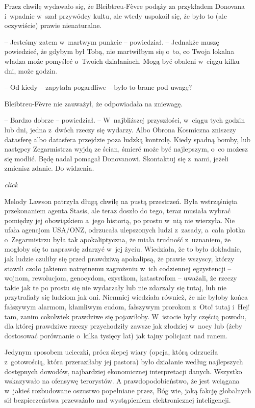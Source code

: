 \documentclass[oneside,polish,11pt,sfheadings]{mwbk}
\begin{document}
Przez chwilę wydawało się, że Bleibtreu-Fèvre podąży za przykładem
Donovana i~wpadnie w~szał przywódcy kultu, ale wtedy uspokoił się, że
było to (ale oczywiście) prawie nienaturalne.

-- Jesteśmy zatem w~martwym punkcie -- powiedział. -- Jednakże muszę
powiedzieć, że gdybym był Tobą, nie martwiłbym się o~to, co Twoja
lokalna władza może pomyśleć o~Twoich działaniach. Mogą być obaleni w~ciągu kilku dni, może godzin.

-- Od kiedy -- zapytała pogardliwe -- było to brane pod uwagę?

Bleibtreu-Fèvre nie zauważył, że odpowiadała na zniewagę. 

-- Bardzo
dobrze -- powiedział. -- W~najbliższej przyszłości, w~ciągu tych godzin
lub dni, jedna z~dwóch rzeczy się wydarzy. Albo Obrona Kosmiczna
zniszczy datasferę albo datasfera przejdzie poza ludzką kontrolę. Kiedy
spadną bomby, lub następcy Zegarmistrza wyjdą ze ścian, śmierć może być
najlepszym, o~co możesz się modlić. Będę nadal pomagał Donovanowi.
Skontaktuj się z~nami, jeżeli zmienisz zdanie. Do widzenia.

\emph{click }

Melody Lawson patrzyła długą chwilę na pustą przestrzeń. Była
wstrząśnięta przekonaniem agenta Stasis, ale teraz doszło do tego, teraz
musiała wybrać pomiędzy jej obowiązkiem a~jego historią, po prostu w~nią
nie wierzyła. Nie ufała agencjom USA/ONZ, odrzucała ulepszonych ludzi z~zasady, a~cała plotka o~Zegarmistrzu była tak apokaliptyczna, że miała
trudność z~uznaniem, że mogłoby się to naprawdę zdarzyć w~jej życiu.
Wiedziała, że to było dokładnie, jak ludzie czuliby się przed prawdziwą
apokalipsą, że prawie wszyscy, którzy stawili czoło jakiemu natrętnemu
zagrożeniu w~ich codziennej egzystencji -- wojnom, rewolucjom, genocydom,
czystkom, katastrofom -- uważali, że rzeczy takie jak te po prostu się
nie wydarzały lub nie zdarzały się tutaj, lub nie przytrafiały się
ludziom jak oni. Niemniej wiedziała również, że nie byłoby końca
fałszywym alarmom, kłamliwym cudom, fałszywym prorokom z~Oto! tutaj i~Hej! tam, zanim cokolwiek prawdziwe się pojawiłoby. W~istocie były
częścią powodu, dla której prawdziwe rzeczy przychodziły zawsze jak
złodziej w~nocy lub (żeby dostosować porównanie o~kilka tysięcy lat) jak
tajny policjant nad ranem.

Jedynym sposobem ucieczki, prócz ślepej wiary (opcja, którą odrzuciła z~gotowością, która przeraziłaby jej pastora) było działanie według
najlepszych dostępnych dowodów, najbardziej ekonomicznej interpretacji
danych. Wszystko wskazywało na ofensywę terorystów. A
prawdopodobieństwo, że jest wciągana w~jakieś rozbudowane oszustwo
popełniane przez, Bóg wie, jaką fakcję globalnych sił bezpieczeństwa
przeważało nad wystąpieniem elektronicznej inteligencji.
\end{document}
